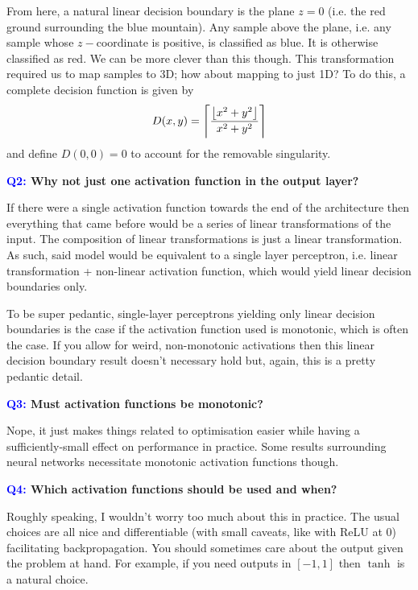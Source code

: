 \documentclass[11pt]{article}
\begin{document}
From here, a natural linear decision boundary is the plane $z=0$ (i.e. the red ground surrounding the blue mountain). Any sample above the plane, i.e. any sample whose $z-$coordinate is positive, is classified as blue. It is otherwise classified as red. We can be more clever than this though. This transformation required us to map samples to 3D; how about mapping to just 1D? To do this, a complete decision function is given by
$$
D(x,y)=\left\lceil\frac{\left\lfloor x^2+y^2\right\rfloor}{x^2+y^2}\right\rceil
$$
and define $D(0,0)=0$ to account for the removable singularity.

\begin{center}
    \textbf{\textcolor{blue}{Q2:} Why not just one activation function in the output layer?}
\end{center}
If there were a single activation function towards the end of the architecture then everything that came before would be a series of linear transformations of the input. The composition of linear transformations is just a linear transformation. As such, said model would be equivalent to a single layer perceptron, i.e. linear transformation + non-linear activation function, which would yield linear decision boundaries only.

To be super pedantic, single-layer perceptrons yielding only linear decision boundaries is the case if the activation function used is monotonic, which is often the case. If you allow for weird, non-monotonic activations then this linear decision boundary result doesn't necessary hold but, again, this is a pretty pedantic detail.

\begin{center}
    \textbf{\textcolor{blue}{Q3:} Must activation functions be monotonic?}
\end{center}
Nope, it just makes things related to optimisation easier while having a sufficiently-small effect on performance in practice. Some results surrounding neural networks necessitate monotonic activation functions though.

\begin{center}
    \textbf{\textcolor{blue}{Q4:} Which activation functions should be used and when?}
\end{center}
Roughly speaking, I wouldn't worry too much about this in practice. The usual choices are all nice and differentiable (with small caveats, like with ReLU at $0$) facilitating backpropagation. You should sometimes care about the output given the problem at hand. For example, if you need outputs in $[-1,1]$ then $\tanh$ is a natural choice.
\end{document}

